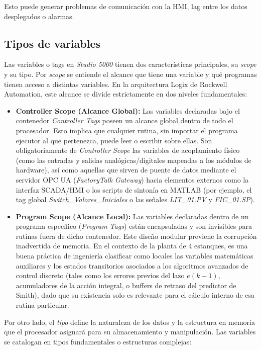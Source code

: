Esto puede generar problemas de comunicación con la HMI, lag entre los datos desplegados o alarmas.

\subsection{Tipos de variables}

Las variables o tags en \textit{Studio 5000} tienen dos características principales, su \textit{scope} y su tipo. Por \textit{scope} se entiende el alcance que tiene una variable y qué programas tienen acceso a distintas variables. En la arquitectura Logix de Rockwell Automation, este alcance se divide estrictamente en dos niveles fundamentales:

\begin{itemize}
    \item \textbf{Controller Scope (Alcance Global):} Las variables declaradas bajo el contenedor \textit{Controller Tags} poseen un alcance global dentro de todo el procesador. Esto implica que cualquier rutina, sin importar el programa ejecutor al que pertenezca, puede leer o escribir sobre ellas. Son obligatoriamente de \textit{Controller Scope} las variables de acoplamiento físico (como las entradas y salidas analógicas/digitales mapeadas a los módulos de hardware), así como aquellas que sirven de puente de datos mediante el servidor OPC UA (\textit{FactoryTalk Gateway}) hacia elementos externos como la interfaz SCADA/HMI o los scripts de sintonía en MATLAB (por ejemplo, el tag global \textit{Switch\_Valores\_Iniciales} o las señales \textit{LIT\_01.PV} y \textit{FIC\_01.SP}).
    \item \textbf{Program Scope (Alcance Local):} Las variables declaradas dentro de un programa específico (\textit{Program Tags}) están encapsuladas y son invisibles para rutinas fuera de dicho contenedor. Este diseño modular previene la corrupción inadvertida de memoria. En el contexto de la planta de 4 estanques, es una buena práctica de ingeniería clasificar como locales las variables matemáticas auxiliares y los estados transitorios asociados a los algoritmos avanzados de control discreto (tales como los errores previos del lazo $e(k-1)$, acumuladores de la acción integral, o buffers de retraso del predictor de Smith), dado que su existencia solo es relevante para el cálculo interno de esa rutina particular.
\end{itemize}

Por otro lado, el \textit{tipo} define la naturaleza de los datos y la estructura en memoria que el procesador asignará para su almacenamiento y manipulación. Las variables se catalogan en tipos fundamentales o estructuras complejas:

